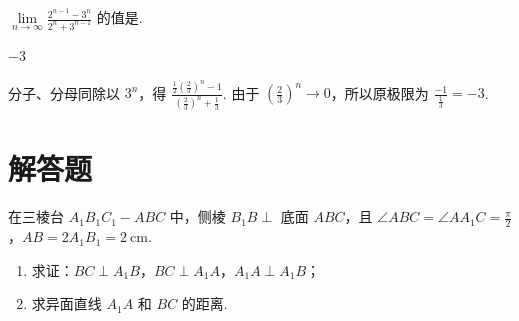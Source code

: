 \documentclass[UTF8,a4paper,oneside,11pt]{ctexbook}
\begin{document}
\begin{problem}

\(\lim\limits_{n\to\infty}\frac{2^{n-1}-3^n}{2^n+3^{n-1}}\) 的值是\fillinblank{}.
\end{problem}

\begin{answer}
\(-3\)
\end{answer}

\begin{solution}
分子、分母同除以 \(3^{n}\)，得
\(\frac{\frac{1}{2}\left(\frac{2}{3}\right)^{n}-1}{\left(\frac{2}{3}\right)^{n}+\frac{1}{3}}\). 由于 \(\left(\frac{2}{3}\right)^{n}\to0\)，所以原极限为 \(\frac{-1}{\frac{1}{3}}=-3\).
\end{solution}

\section{解答题}

\begin{problem}

在三棱台 \(A_{1}B_{1}C_{1}-ABC\) 中，侧棱 \(B_{1}B \perp\) 底面 \(ABC\)，且 \(\angle ABC = \angle AA_{1}C = \frac{\pi}{2}\)，\(AB = 2A_{1}B_{1} = 2\mathrm{~cm}\).

\begin{enumerate}
\item 求证：\(BC \perp A_{1}B\)，\(BC \perp A_{1}A\)，\(A_{1}A \perp A_{1}B\)；
\item 求异面直线 \(A_{1}A\) 和 \(BC\) 的距离.
\end{enumerate}

\end{problem}
\end{document}
